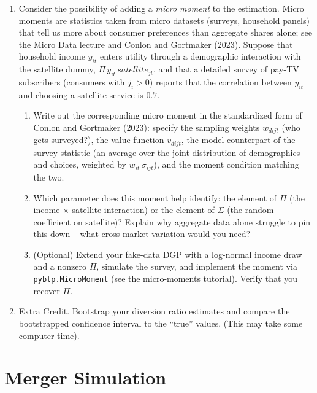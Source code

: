 \documentclass[english,11pt]{article}
\begin{document}
\begin{enumerate}
\item[9a.] Consider the possibility of adding a \textit{micro moment} to
the estimation. Micro moments are statistics taken from micro datasets
(surveys, household panels) that tell us more about consumer preferences
than aggregate shares alone; see the Micro Data lecture and Conlon and
Gortmaker (2023). Suppose that household income $y_{it}$ enters utility
through a demographic interaction with the satellite dummy, $\Pi \,
y_{it}\, satellite_{jt}$, and that a detailed survey of pay-TV subscribers
(consumers with $j_{i}>0$) reports that the correlation between $y_{it}$
and choosing a satellite service is $0.7$.
\begin{enumerate}
\item Write out the corresponding micro moment in the standardized form of
Conlon and Gortmaker (2023): specify the sampling weights $w_{dijt}$ (who
gets surveyed?), the value function $v_{dijt}$, the model counterpart of the
survey statistic (an average over the joint distribution of demographics and
choices, weighted by $w_{it}\,\sigma _{ijt}$), and the moment condition
matching the two.
\item Which parameter does this moment help identify: the element of $\Pi $
(the income $\times $ satellite interaction) or the element of $\Sigma $
(the random coefficient on satellite)? Explain why aggregate data alone
struggle to pin this down -- what cross-market variation would you need?
\item (Optional) Extend your fake-data DGP with a log-normal income draw and
a nonzero $\Pi $, simulate the survey, and implement the moment via %
\texttt{pyblp.MicroMoment} (see the micro-moments tutorial). Verify that you
recover $\Pi $.
\end{enumerate}

\item[9$^{*}$] Extra Credit. Bootstrap your diversion ratio estimates and compare the bootstrapped confidence interval to the ``true'' values. (This may take some computer time).
\end{enumerate}

\section{Merger Simulation}
\end{document}
